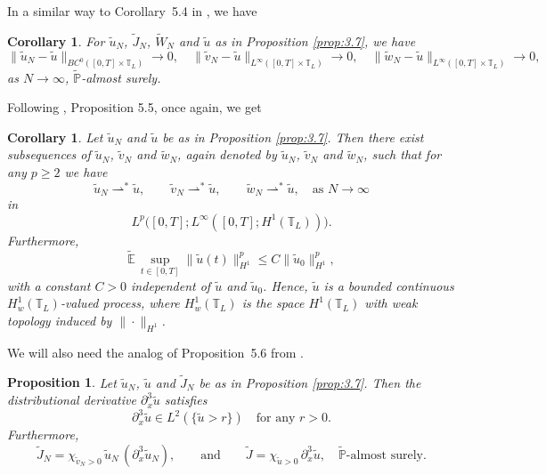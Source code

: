 \documentclass[a4paper,12pt]{article}
\newtheorem{corollary}[definition]{Corollary}
\newtheorem{proposition}[definition]{Proposition}
\numberwithin{equation}{section}
\def\T{\mathbb{T}_L}
\begin{document}
In a similar way to Corollary~5.4 in \cite{Gess1}, we have

\begin{corollary}\label{cor:3.8}
For $\tilde u_N$, $\tilde J_N$, $\tilde W_N$ and $\tilde u$ as in Proposition \ref{prop:3.7}, we have
\begin{equation}\label{3.19}
\|\tilde u_N - \tilde u\|_{BC^0([0,T]\times \T)} \to 0,
\quad
\|\tilde v_N - \tilde u\|_{L^\infty([0,T]\times \T)} \to 0,
\quad
\|\tilde w_N - \tilde u\|_{L^\infty([0,T]\times \T)} \to 0,
\tag{3.19}
\end{equation}
as $N \to \infty$, $\tilde{\mathbb{P}}$-almost surely.
\end{corollary}

\medskip

Following  \cite{Gess1}, Proposition 5.5, once again, we get

\begin{corollary}\label{cor:3.9}
Let $\tilde u_N$ and $\tilde u$ be as in Proposition \ref{prop:3.7}.
Then there exist subsequences of $\tilde u_N$, $\tilde v_N$ and $\tilde w_N$, again denoted by
$\tilde u_N$, $\tilde v_N$ and $\tilde w_N$, such that for any $p \geq 2$ we have
\begin{equation*} \label{3.20}
\tilde u_N \rightharpoonup^\ast \tilde u,
\qquad
\tilde v_N \rightharpoonup^\ast \tilde u,
\qquad
\tilde w_N \rightharpoonup^\ast \tilde u,
\quad \text{as } N \to \infty
\end{equation*}
in
\[
L^p\bigl([0,T]; L^\infty([0,T]; H^1(\T))\bigr).
\]
Furthermore,
\begin{equation*}
\tilde{\mathbb{E}} \, \sup_{t \in [0,T]} \|\tilde u(t)\|_{H^1}^p
\le C \|\tilde u_0\|_{H^1}^p,
\end{equation*}
with a constant $C>0$ independent of $\tilde u$ and $\tilde u_0$.
Hence, $\tilde u$ is a bounded continuous $H^1_w(\T)$-valued process, where
$H^1_w(\T)$ is the space $H^1(\T)$ with weak topology induced by $\|\cdot\|_{H^1}$.
\end{corollary}

\medskip

We will also need the analog of Proposition~5.6 from \cite{Gess1}.

\begin{proposition}\label{prop:3.10}
Let $\tilde u_N$, $\tilde u$ and $\tilde J_N$ be as in Proposition \ref{prop:3.7}.
Then the distributional derivative $\partial_x^3 \tilde u$ satisfies
\[
\partial_x^3 \tilde u \in L^2(\{ \tilde u > r \})
\quad \text{for any } r > 0.
\]
Furthermore,
\[
\tilde J_N = \chi_{\tilde v_N > 0}\, \tilde u_N \, (\partial_x^3 \tilde u_N),
\qquad
\text{and}
\qquad
\tilde J = \chi_{\tilde u > 0}\, \partial_x^3 \tilde u,
\quad \tilde{\mathbb{P}}\text{-almost surely}.
\]
\end{proposition}
\end{document}
